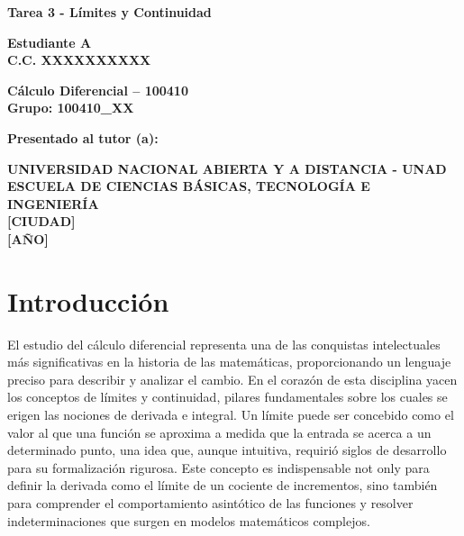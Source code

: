 \documentclass{article}
\begin{document}
\begin{center}
    \textbf{Tarea 3 - Límites y Continuidad}

    \vspace{2cm}

    \textbf{Estudiante A} \\
    \textbf{C.C. XXXXXXXXXX}

    \vspace{2cm}

    \textbf{Cálculo Diferencial -- 100410} \\
    \textbf{Grupo: 100410\_XX}

    \vspace{2cm}

    \textbf{Presentado al tutor (a):} \\
    [Nombre del Tutor]

    \vspace{3cm}

    \textbf{UNIVERSIDAD NACIONAL ABIERTA Y A DISTANCIA - UNAD} \\
    \textbf{ESCUELA DE CIENCIAS BÁSICAS, TECNOLOGÍA E INGENIERÍA} \\
    \textbf{[CIUDAD]} \\
    \textbf{[AÑO]}
\end{center}

\newpage

\section*{Introducción}

El estudio del cálculo diferencial representa una de las conquistas intelectuales más significativas en la historia de las matemáticas, proporcionando un lenguaje preciso para describir y analizar el cambio. En el corazón de esta disciplina yacen los conceptos de límites y continuidad, pilares fundamentales sobre los cuales se erigen las nociones de derivada e integral. Un límite puede ser concebido como el valor al que una función se aproxima a medida que la entrada se acerca a un determinado punto, una idea que, aunque intuitiva, requirió siglos de desarrollo para su formalización rigurosa. Este concepto es indispensable not only para definir la derivada como el límite de un cociente de incrementos, sino también para comprender el comportamiento asintótico de las funciones y resolver indeterminaciones que surgen en modelos matemáticos complejos.
\end{document}
